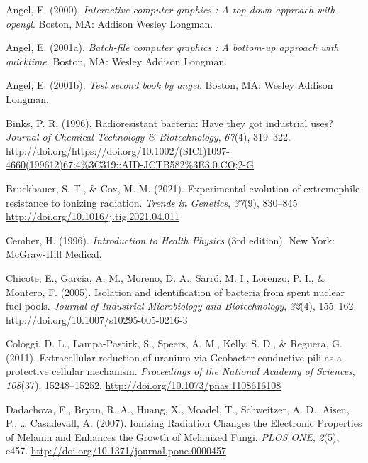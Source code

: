 \documentclass[12pt,twoside]{reedthesis}
\begin{document}
\setlength{\parindent}{-0.20in}

\hypertarget{refs}{}
\leavevmode\hypertarget{ref-angel2000}{}%
Angel, E. (2000). \emph{Interactive computer graphics : A top-down approach with opengl}. Boston, MA: Addison Wesley Longman.

\leavevmode\hypertarget{ref-angel2001}{}%
Angel, E. (2001a). \emph{Batch-file computer graphics : A bottom-up approach with quicktime}. Boston, MA: Wesley Addison Longman.

\leavevmode\hypertarget{ref-angel2002a}{}%
Angel, E. (2001b). \emph{Test second book by angel}. Boston, MA: Wesley Addison Longman.

\leavevmode\hypertarget{ref-binks_radioresistant_1996}{}%
Binks, P. R. (1996). Radioresistant bacteria: Have they got industrial uses? \emph{Journal of Chemical Technology \& Biotechnology}, \emph{67}(4), 319--322. \url{http://doi.org/https://doi.org/10.1002/(SICI)1097-4660(199612)67:4\%3C319::AID-JCTB582\%3E3.0.CO;2-G}

\leavevmode\hypertarget{ref-bruckbauer_experimental_2021}{}%
Bruckbauer, S. T., \& Cox, M. M. (2021). Experimental evolution of extremophile resistance to ionizing radiation. \emph{Trends in Genetics}, \emph{37}(9), 830--845. \url{http://doi.org/10.1016/j.tig.2021.04.011}

\leavevmode\hypertarget{ref-cember_introduction_1996}{}%
Cember, H. (1996). \emph{Introduction to Health Physics} (3rd edition). New York: McGraw-Hill Medical.

\leavevmode\hypertarget{ref-chicote_isolation_2005}{}%
Chicote, E., García, A. M., Moreno, D. A., Sarró, M. I., Lorenzo, P. I., \& Montero, F. (2005). Isolation and identification of bacteria from spent nuclear fuel pools. \emph{Journal of Industrial Microbiology and Biotechnology}, \emph{32}(4), 155--162. \url{http://doi.org/10.1007/s10295-005-0216-3}

\leavevmode\hypertarget{ref-cologgi_extracellular_2011}{}%
Cologgi, D. L., Lampa-Pastirk, S., Speers, A. M., Kelly, S. D., \& Reguera, G. (2011). Extracellular reduction of uranium via Geobacter conductive pili as a protective cellular mechanism. \emph{Proceedings of the National Academy of Sciences}, \emph{108}(37), 15248--15252. \url{http://doi.org/10.1073/pnas.1108616108}

\leavevmode\hypertarget{ref-dadachova_ionizing_2007}{}%
Dadachova, E., Bryan, R. A., Huang, X., Moadel, T., Schweitzer, A. D., Aisen, P., \ldots{} Casadevall, A. (2007). Ionizing Radiation Changes the Electronic Properties of Melanin and Enhances the Growth of Melanized Fungi. \emph{PLOS ONE}, \emph{2}(5), e457. \url{http://doi.org/10.1371/journal.pone.0000457}
\end{document}
